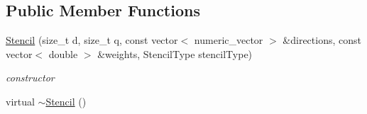 \subsection*{Public Member Functions}
\begin{DoxyCompactItemize}
\item 
\hyperlink{classnatrium_1_1Stencil_a5a65aa1dbfeceb278bd70c3c760c14fd}{Stencil} (size\_\-t d, size\_\-t q, const vector$<$ numeric\_\-vector $>$ \&directions, const vector$<$ double $>$ \&weights, StencilType stencilType)
\begin{DoxyCompactList}\small\item\em constructor \item\end{DoxyCompactList}\item 
\hypertarget{classnatrium_1_1Stencil_aff8956ea1dca43ed70f513baa755331f}{
virtual \hyperlink{classnatrium_1_1Stencil_aff8956ea1dca43ed70f513baa755331f}{$\sim$Stencil} ()}
\label{classnatrium_1_1Stencil_aff8956ea1dca43ed70f513baa755331f}


\end{DoxyCompactItemize}
